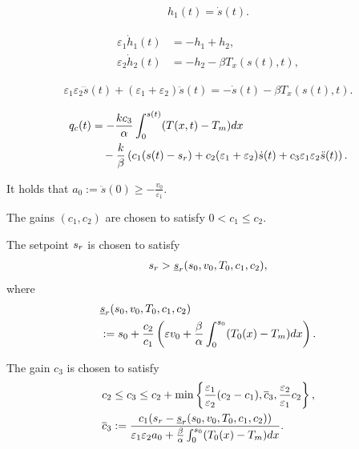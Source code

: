 \documentclass[10pt,a4paper]{amsart}
\newcommand{\ep}{\varepsilon}
\begin{document}
\begin{align} \label{eq:h1-def}
    h_1(t) = \dot s(t).  
\end{align}

\begin{align} \label{eq:h1-ODE}
    \ep_1 \dot h_1(t) &= - h_1 + h_2, \\
 \label{eq:h2-ODE}  \ep_2 \dot h_2(t) &= - h_{2} - \beta T_x(s(t),t), 
\end{align}

\begin{align}
   \ep_1 \ep_2 \dddot s(t) + ( \ep_1 + \ep_2) \ddot s(t) = - \dot s(t) - \beta T_x(s(t),t). \label{eq:stefan-thrid-ODE}
\end{align}

\begin{align}
    q_{\rm c}(t)
    & = - \frac{ k c_3}{\alpha}  \int_0^{s(t)}  (T(x,t) - T_{\rm m})  dx \notag\\
    & \quad - \frac{k}{\beta} \left (c_1 (s(t) - s_{\rm r}) + c_2 (\ep_1 + \ep_2)  \dot s(t) + c_3 \ep_1 \ep_2 \ddot s(t) \right).  \label{eq:third-qct-exp}
\end{align}

\begin{assum} \label{ass:a0}
  It holds that $ a_0 := \ddot s(0) \geq - \frac{v_0}{\ep_1}$. 
\end{assum}

\begin{assum} \label{ass:third-gain12} 
The gains $(c_1, c_2)$ are chosen to satisfy
$0 < c_1 \leq c_2$. 
\end{assum}

\begin{assum} \label{ass:third-setpoint}
The setpoint $s_{\rm r}$ is chosen to satisfy 
    \begin{align}
    s_{\rm r} > \underline{s}_{\rm r}(s_0, v_0, T_0, c_1, c_2)  , \label{eq:third-setpoint}
    \end{align}
    where 
    \begin{eqnarray}
   & \underline{s}_{\rm r}(s_0, v_0, T_0, c_1, c_2) \notag\\
    &:= s_0 + \frac{c_2}{c_1} \left( \ep v_0 + \frac{  \beta}{ \alpha }  \int_0^{s_0}  (T_0(x) - T_{\rm m})  dx \right). \label{eq:third-srunder}
    \end{eqnarray} 
\end{assum}

\begin{assum} \label{ass:third-gain3}
    The gain $c_3$ is chosen to satisfy 
       \begin{align} \label{eq:third-gain3-cond}
        c_2 & \leq c_3 \leq c_2 + \min \left\{\frac{\ep_1}{\ep_2}(c_2 - c_1) , \overline{c}_3, 
        \frac{\ep_2}{\ep_1} c_2
        \right\} , \\
      \overline{c}_3 & :=   \frac{c_1 ( s_{\rm r} - \underline{s}_{\rm r}(s_0, v_0, T_0, c_1, c_2))}{ \ep_1 \ep_2 a_0 +  \frac{ \beta }{\alpha}  \int_0^{s_0}  (T_0(x) - T_{\rm m})  dx }.  
    \end{align}
\end{assum}
\end{document}
